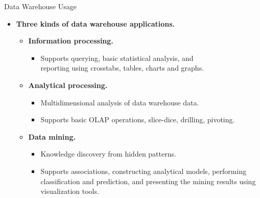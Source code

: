 \begin{frame}{Data Warehouse Usage}
  \begin{itemize}
  \item \textbf{Three kinds of data warehouse applications.}
    \begin{itemize}
    \item \textbf{\color{airforceblue}Information processing.}
      \begin{itemize}
      \item Supports querying, basic statistical analysis, and \\ reporting using crosstabs, tables, charts and graphs.
      \end{itemize}
    \item \textbf{\color{airforceblue}Analytical processing.}
      \begin{itemize}
      \item Multidimensional analysis of data warehouse data.
      \item Supports basic OLAP operations, slice-dice, drilling, pivoting.
      \end{itemize}
    \item \textbf{\color{airforceblue}Data mining.}
      \begin{itemize}
      \item Knowledge discovery from hidden patterns.
      \item Supports associations, constructing analytical models, performing classification and prediction, and presenting the mining results using visualization tools.
      \end{itemize}
    \end{itemize}
  \end{itemize}
\end{frame}

